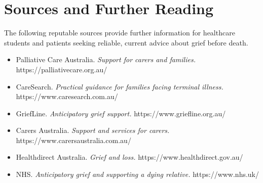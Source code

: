 \section*{Sources and Further Reading}
The following reputable sources provide further information for healthcare students and patients seeking reliable, current advice about grief before death.

\begin{itemize}
    \item Palliative Care Australia. \textit{Support for carers and families.} https://palliativecare.org.au/
    \item CareSearch. \textit{Practical guidance for families facing terminal illness.} https://www.caresearch.com.au/
    \item GriefLine. \textit{Anticipatory grief support.} https://www.griefline.org.au/
    \item Carers Australia. \textit{Support and services for carers.} https://www.carersaustralia.com.au/
    \item Healthdirect Australia. \textit{Grief and loss.} https://www.healthdirect.gov.au/
    \item NHS. \textit{Anticipatory grief and supporting a dying relative.} https://www.nhs.uk/
\end{itemize}
